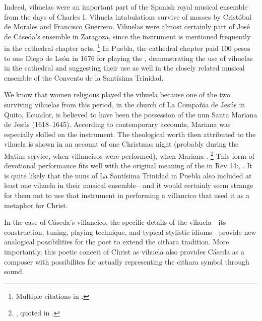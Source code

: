 
Indeed, vihuelas were an important part of the Spanish royal musical ensemble from the days of Charles I.
Vihuela intabulations survive of masses by Cristóbal de Morales and Francisco Guerrero.%
	\autocite{Grove:Vihuela}
Vihuelas were almost certainly part of José de Cáseda's ensemble in Zaragoza, since the instrument is mentioned frequently in the cathedral chapter acts.%
	\footnote{%
	Multiple citations in \autocite{Calahorra:Zaragoza2}.
	}
In Puebla, the cathedral chapter paid 100 pesos to one Diego de León in 1676 for playing the ,%
	\autocite[44]{PerezRuiz:Aportes}
demonstrating the use of vihuelas in the cathedral and suggesting their use as well in the closely related musical ensemble of the Convento de la Santísima Trinidad.

We know that women religious played the vihuela because one of the two surviving vihuelas from this period, in the church of La Compañia de Jesús in Quito, Ecuador, is believed to have been the possession of the nun Santa Mariana de Jesús (1618--1645).
According to contemporary accounts, Mariana was especially skilled on the instrument. 
The theological worth then attributed to the vihuela is shown in an account of one Christmas night (probably during the Matins service, when villancicos were performed), when Mariana .
	\footnote{%
	\autocite[275]{EspinosaPolit:SantaMariana}, quoted in \autocite[73]{Bermudez:Vihuela}.
	}
This form of devotional performance fits well with the original meaning of the
 in Rev 14:, .%
	\autocite{BDAG}
It is quite likely that the nuns of La Santísima Trinidad in Puebla also included at least one vihuela in their musical ensemble---and it would certainly seem strange for them not to use that instrument in performing a villancico that used it as a metaphor for Christ.

In the case of Cáseda's villancico, the specific details of the vihuela---its construction, tuning, playing technique, and typical stylistic idioms---provide new analogical possibilities for the poet to extend the cithara tradition.
More importantly, this poetic conceit of Christ as vihuela also provides Cáseda as a composer with possibilites for actually representing the cithara symbol through sound.

